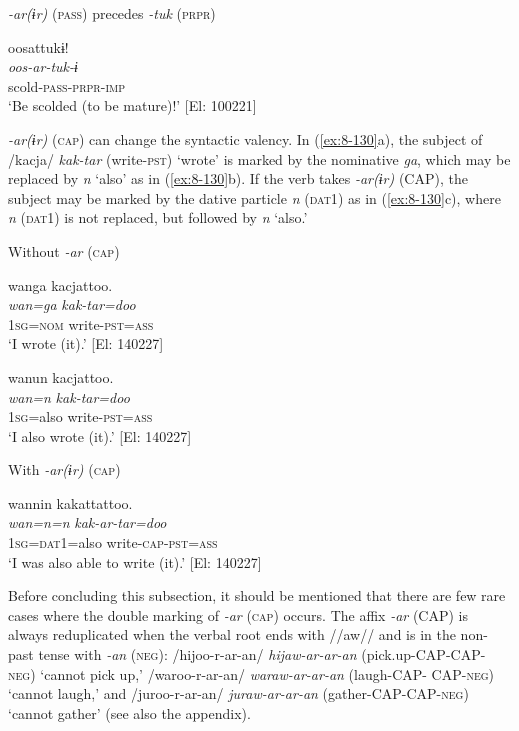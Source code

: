 \ex \textit{-ar(ɨr)} (\textsc{pass}) precedes \textit{-tuk} (\textsc{prpr})

  {\TM}
\glll  oosattukɨ!\\
\textit{oos-ar-tuk-ɨ}\\
  scold-\textsc{pass}-\textsc{prpr}-\textsc{imp}\\
\glt ‘Be scolded (to be mature)!’ [El: 100221]
\z
\z

  \textit{-ar(ɨr)} (\textsc{cap}) can change the syntactic valency. In (\ref{ex:8-130}a), the subject of /kacja/ \textit{kak-tar} (write-\textsc{pst}) ‘wrote’ is marked by the nominative \textit{ga}, which may be replaced by \textit{n} ‘also’ as in (\ref{ex:8-130}b). If the verb takes \textit{-ar(ɨr)} (CAP), the subject may be marked by the dative particle \textit{n} (\textsc{dat1}) as in (\ref{ex:8-130}c), where \textit{n} (\textsc{dat1}) is not replaced, but followed by \textit{n} ‘also.’

\ea\label{ex:8-130}
  Without \textit{-ar} (\textsc{cap})

\ea
{\TM}
\glll  wanga  kacjattoo.\\
\textit{wan=ga}  \textit{kak-tar=doo}\\
1\textsc{sg}=\textsc{nom}  write-\textsc{pst}=\textsc{ass}\\
\glt ‘I wrote (it).’ [El: 140227]

\ex
{\TM}
\glll  wanun  kacjattoo.\\
\textit{wan=n}  \textit{kak-tar=doo}\\
1\textsc{sg}=also  write-\textsc{pst}=\textsc{ass}\\
\glt ‘I also wrote (it).’ [El: 140227]

  With \textit{-ar(ɨr)} (\textsc{cap})

\ex
{\TM}
\glll  wannin  kakattattoo.\\
\textit{wan=n=n}  \textit{kak-ar-tar=doo}\\
1\textsc{sg}=\textsc{dat1}=also  write-\textsc{cap}-\textsc{pst}=\textsc{ass}\\
\glt ‘I was also able to write (it).’ [El: 140227]
\z
\z

  Before concluding this subsection, it should be mentioned that there are few rare cases where the double marking of \textit{-ar} (\textsc{cap}) occurs. The affix \textit{-ar} (CAP) is always reduplicated when the verbal root ends with //aw// and is in the non-past tense with \textit{-an} (\textsc{neg}): /hijoo-r-ar-an/ \textit{hijaw-ar-ar-an} (pick.up-CAP-CAP-\textsc{neg}) ‘cannot pick up,’ /waroo-r-ar-an/ \textit{waraw-ar-ar-an} (laugh-CAP- CAP-\textsc{neg}) ‘cannot laugh,’ and /juroo-r-ar-an/ \textit{juraw-ar-ar-an} (gather-CAP-CAP-\textsc{neg}) ‘cannot gather’ (see also the appendix).

